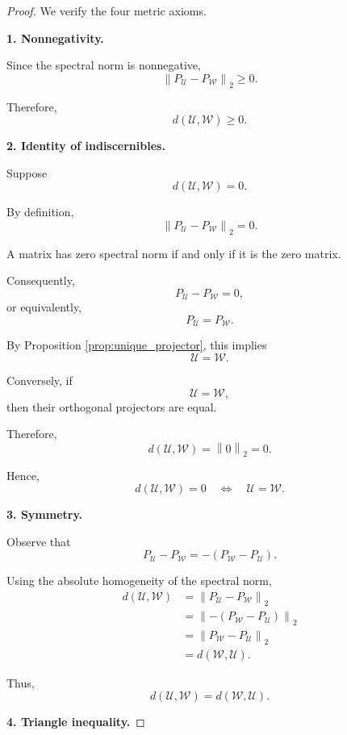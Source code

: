 \documentclass[14pt,letterpaper]{article}
\theoremstyle{plain}
\theoremstyle{definition}
\theoremstyle{remark}
\newcommand{\norm}[1]{\left\lVert #1 \right\rVert}
\begin{document}
\begin{proof}

We verify the four metric axioms.

\medskip

\noindent
\textbf{1. Nonnegativity.}

Since the spectral norm is
nonnegative,
\[
\norm{
P_{\mathcal U}-P_{\mathcal W}
}_2
\geq0.
\]

Therefore,
\[
\boxed{
d(\mathcal U,\mathcal W)\geq0.
}
\]

\medskip

\noindent
\textbf{2. Identity of indiscernibles.}

Suppose
\[
d(\mathcal U,\mathcal W)=0.
\]

By definition,
\[
\norm{
P_{\mathcal U}-P_{\mathcal W}
}_2=0.
\]

A matrix has zero spectral
norm if and only if it is
the zero matrix.

Consequently,
\[
P_{\mathcal U}-P_{\mathcal W}=0,
\]
or equivalently,
\[
P_{\mathcal U}=P_{\mathcal W}.
\]

By Proposition
\ref{prop:unique_projector},
this implies
\[
\mathcal U=\mathcal W.
\]

Conversely, if
\[
\mathcal U=\mathcal W,
\]
then their orthogonal
projectors are equal.

Therefore,
\[
d(\mathcal U,\mathcal W)
=
\norm{0}_2=0.
\]

Hence,
\[
\boxed{
d(\mathcal U,\mathcal W)=0
\quad\Longleftrightarrow\quad
\mathcal U=\mathcal W.
}
\]

\medskip

\noindent
\textbf{3. Symmetry.}

Observe that
\[
P_{\mathcal U}-P_{\mathcal W}
=
-\left(
P_{\mathcal W}-P_{\mathcal U}
\right).
\]

Using the absolute homogeneity
of the spectral norm,
\[
\begin{aligned}
d(\mathcal U,\mathcal W)
&=
\norm{
P_{\mathcal U}-P_{\mathcal W}
}_2\\
&=
\norm{
-\left(
P_{\mathcal W}-P_{\mathcal U}
\right)
}_2\\
&=
\norm{
P_{\mathcal W}-P_{\mathcal U}
}_2\\
&=
d(\mathcal W,\mathcal U).
\end{aligned}
\]

Thus,
\[
\boxed{
d(\mathcal U,\mathcal W)
=
d(\mathcal W,\mathcal U).
}
\]

\medskip

\noindent
\textbf{4. Triangle inequality.}


\end{proof}
\end{document}
